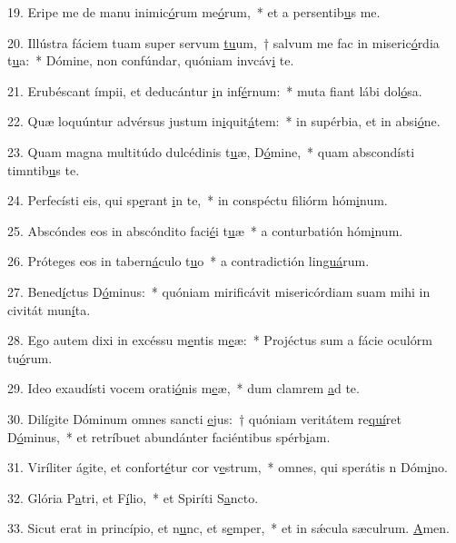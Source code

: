 19. Eripe me de manu inimic\uline{ó}rum me\uline{ó}rum,~* et a persentib\uline{u}s me.\par 
20. Illústra fáciem tuam super servum \uline{tu}um,~† salvum me fac in miseric\uline{ó}rdia t\uline{u}a:~* Dómine, non confúndar, quóniam invcáv\uline{i} te.\par 
21. Erubéscant ímpii, et deducántur \uline{i}n inf\uline{é}rnum:~* muta fiant lábi dol\uline{ó}sa.\par 
22. Quæ loquúntur advérsus justum in\uline{i}quit\uline{á}tem:~* in supérbia, et in absi\uline{ó}ne.\par 
23. Quam magna multitúdo dulcédinis t\uline{u}æ, D\uline{ó}mine,~* quam abscondísti timntib\uline{u}s te.\par 
24. Perfecísti eis, qui sp\uline{e}rant \uline{i}n te,~* in conspéctu filiórm hóm\uline{i}num.\par 
25. Abscóndes eos in abscóndito faci\uline{é}i t\uline{u}æ~* a conturbatión hóm\uline{i}num.\par 
26. Próteges eos in tabern\uline{á}culo t\uline{u}o~* a contradictión lin\uline{guá}rum.\par 
27. Bened\uline{í}ctus D\uline{ó}minus:~* quóniam mirificávit misericórdiam suam mihi in civitát mun\uline{í}ta.\par 
28. Ego autem dixi in excéssu m\uline{e}ntis m\uline{e}æ:~* Projéctus sum a fácie oculórm tu\uline{ó}rum.\par 
29. Ideo exaudísti vocem orati\uline{ó}nis m\uline{e}æ,~* dum clamrem \uline{a}d te.\par 
30. Dilígite Dóminum omnes sancti \uline{e}jus:~† quóniam veritátem re\uline{quí}ret D\uline{ó}minus,~* et retríbuet abundánter faciéntibus spérb\uline{i}am.\par 
31. Viríliter ágite, et confort\uline{é}tur cor v\uline{e}strum,~* omnes, qui sperátis n Dóm\uline{i}no.\par 
32. Glória P\uline{a}tri, et F\uline{í}lio,~* et Spiríti S\uline{a}ncto.\par 
33. Sicut erat in princípio, et n\uline{u}nc, et s\uline{e}mper,~* et in sǽcula sæculrum. \uline{A}men.\par 

